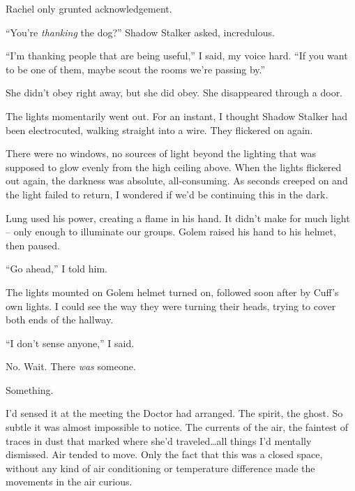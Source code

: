Rachel only grunted acknowledgement.



``You're \emph{thanking} the dog?'' Shadow Stalker asked, incredulous.



``I'm thanking people that are being useful,'' I said, my voice hard.  ``If you want to be one of them, maybe scout the rooms we're passing by.''



She didn't obey right away, but she did obey.  She disappeared through a door.



The lights momentarily went out.  For an instant, I thought Shadow Stalker had been electrocuted, walking straight into a wire.  They flickered on again.



There were no windows, no sources of light beyond the lighting that was supposed to glow evenly from the high ceiling above.  When the lights flickered out again, the darkness was absolute, all-consuming.  As seconds creeped on and the light failed to return, I wondered if we'd be continuing this in the dark.



Lung used his power, creating a flame in his hand.  It didn't make for much light – only enough to illuminate our groups.  Golem raised his hand to his helmet, then paused.



``Go ahead,'' I told him.



The lights mounted on Golem helmet turned on, followed soon after by Cuff's own lights.  I could see the way they were turning their heads, trying to cover both ends of the hallway.



``I don't sense anyone,'' I said.



No.  Wait.  There \emph{was} someone.



Something.



I'd sensed it at the meeting the Doctor had arranged.  The spirit, the ghost.  So subtle it was almost impossible to notice.  The currents of the air, the faintest of traces in dust that marked where she'd traveled\ldots all things I'd mentally dismissed.  Air tended to move.  Only the fact that this was a closed space, without any kind of air conditioning or temperature difference made the movements in the air curious.



